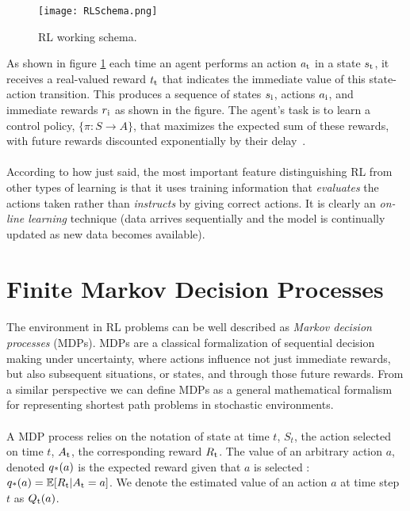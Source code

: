 \begin{figure}[h!]
\centering
\texttt{[image: RLSchema.png]}
  \caption{RL working schema.}
  \label{fig:RLWS}
\end{figure}

As shown in figure \ref{fig:RLWS} each time an agent performs an action $a\textsubscript{t}$ in a state $s\textsubscript{t}$, it receives a real-valued reward $t\textsubscript{t}$ that indicates the immediate value of this state-action transition. This produces a sequence of states $s\textsubscript{i}$, actions $a\textsubscript{i}$, and immediate rewards $r\textsubscript{i}$ as shown in the figure. The agent's task is to learn a control policy, $\{\pi : S \longrightarrow A\}$, that maximizes the expected sum of these rewards, with future rewards discounted exponentially by their delay~\cite{Mitchell}.

\paragraph{} According to how just said, the most important feature distinguishing RL from other types of learning is that it uses training information that \textit{evaluates} the actions taken rather than \textit{instructs} by giving correct actions. It is clearly an \textit{on-line learning} technique (data arrives sequentially and the model is continually updated as new data becomes available).

\section{Finite Markov Decision Processes}

\paragraph{} The environment in RL problems can be well described as \textit{Markov decision processes} (MDPs). MDPs are a classical formalization of sequential decision making under uncertainty, where actions influence not just immediate rewards, but also subsequent situations, or states, and through those future rewards. From a similar perspective we can define MDPs as a general mathematical formalism for representing shortest path problems in stochastic environments.

\paragraph{} A MDP process relies on the notation of state at time $t$, $S_t$, the action selected on time $t$, $A\textsubscript{t}$, the corresponding reward $R\textsubscript{t}$. The value of an arbitrary action $a$, denoted $q\textsubscript{*}(a)$ is the expected reward given that $a$ is selected : $q\textsubscript{*}(a) = \mathbb{E}[ R\textsubscript{t}|A\textsubscript{t} = a ]$. We denote the estimated value of an action $a$ at time step $t$ as $Q\textsubscript{t}(a)$.

